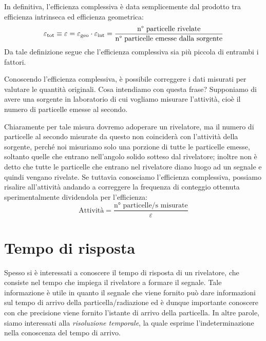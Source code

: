 In definitiva, l'efficienza complessiva è data semplicemente dal prodotto tra efficienza intrinseca ed efficienza geometrica:
\begin{equation*}
   \varepsilon_{\rm tot}
   \equiv \varepsilon
   =\varepsilon_{\rm geo} \cdot \varepsilon_{\rm int}
   =\frac{\text{n° particelle rivelate}}{\text{n° particelle emesse dalla sorgente}}
\end{equation*}
Da tale definizione segue che l'efficienza complessiva sia più piccola di entrambi i fattori.

\begin{esempio}
   Conoscendo l'efficienza complessiva, è possibile correggere i dati misurati per valutare le quantità originali. Cosa intendiamo con questa frase? Supponiamo di avere una sorgente in laboratorio di cui vogliamo misurare l'attività, cioè il numero di particelle emesse al secondo.

   Chiaramente per tale misura dovremo adoperare un rivelatore, ma il numero di particelle al secondo misurate da questo non coinciderà con l'attività della sorgente, perché noi misuriamo solo una porzione di tutte le particelle emesse, soltanto quelle che entrano nell'angolo solido sotteso dal rivelatore; inoltre non è detto che tutte le particelle che entrano nel rivelatore diano luogo ad un segnale e quindi vengano rivelate. Se tuttavia conosciamo l'efficienza complessiva, possiamo risalire all'attività andando a correggere la frequenza di conteggio ottenuta sperimentalmente dividendola per l'efficienza:
   \begin{equation*}
      \text{Attività}=\frac{\text{n° particelle/s misurate}}{\varepsilon}
   \end{equation*}
\end{esempio}

\section{Tempo di risposta}
Spesso si è interessati a conoscere il tempo di risposta di un rivelatore, che consiste nel tempo che impiega il rivelatore a formare il segnale. Tale informazione è utile in quanto il segnale che viene fornito può dare informazioni sul tempo di arrivo della particella/radiazione ed è dunque importante conoscere con che precisione viene fornito l'istante di arrivo della particella. In altre parole, siamo interessati alla \textit{risoluzione temporale}, la quale esprime l'indeterminazione nella conoscenza del tempo di arrivo.

